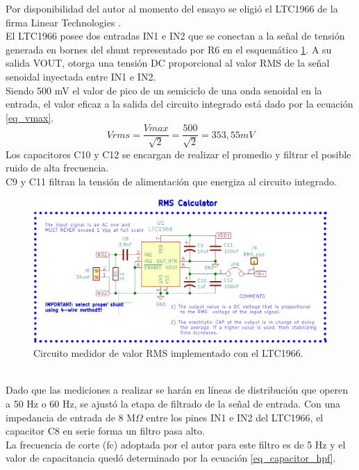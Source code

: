 Por disponibilidad del autor al momento del ensayo se eligió el LTC1966 de la firma Linear Technologies \citep{ad636}.\\
El LTC1966 posee dos entradas IN1 e IN2 que se conectan a la señal de tensión generada en bornes del shunt representado por R6 en el esquemático \ref{fig:ctomedidorrms}. A su salida VOUT, otorga una tensión DC proporcional al valor RMS de la señal senoidal inyectada entre IN1 e IN2.\\
Siendo 500 mV el valor de pico de un semiciclo de una onda senoidal en la entrada, el valor eficaz a la salida del circuito integrado est\'{a} dado por la ecuación \ref{eq_vmax}.
\begin{equation}
	\label{eq_vmax}
	Vrms=\frac{Vmax}{\sqrt{2}}=\frac{500}{\sqrt{2}}= 353,55 mV
\end{equation}
Los capacitores C10 y C12 se encargan de realizar el promedio y filtrar el posible ruido de alta frecuencia.\\
C9 y C11 filtran la tensión de alimentación que energiza al circuito integrado.\\
\begin{figure}[h!]
	\centering
	\includegraphics[width=1.0\linewidth]{Figures/cto_medidor_rms}
	\caption{Circuito medidor de valor RMS implementado con el LTC1966.}
	\label{fig:ctomedidorrms}
\end{figure}\\
Dado que las mediciones a realizar se harán en líneas de distribución que operen a 50 Hz o 60 Hz, se ajustó la etapa de filtrado de la señal de entrada. Con una impedancia de entrada de 8 M$\Omega$ entre los pines IN1 e IN2 del LTC1966, el capacitor C8 en serie forma un filtro pasa alto.\\
La frecuencia de corte (fc) adoptada por el autor para este filtro es de 5 Hz y el valor de capacitancia quedó determinado por la ecuación \ref{eq_capacitor_hpf}.
